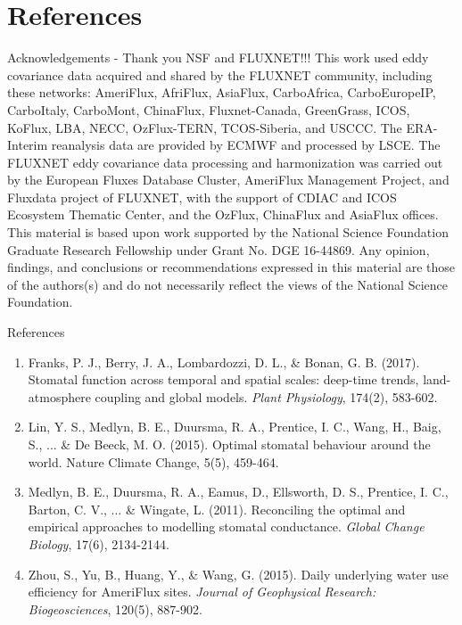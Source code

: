 \documentclass[aspectratio=169]{beamer}
\begin{document}
\section{References}
\begin{frame}{Acknowledgements - Thank you NSF and FLUXNET!!!}
 This work used eddy covariance data acquired and shared by the FLUXNET community, including these networks: AmeriFlux, AfriFlux, AsiaFlux, CarboAfrica, CarboEuropeIP, CarboItaly, CarboMont, ChinaFlux, Fluxnet-Canada, GreenGrass, ICOS, KoFlux, LBA, NECC, OzFlux-TERN, TCOS-Siberia, and USCCC. The ERA-Interim reanalysis data are provided by ECMWF and processed by LSCE. The FLUXNET eddy covariance data processing and harmonization was carried out by the European Fluxes Database Cluster, AmeriFlux Management Project, and Fluxdata project of FLUXNET, with the support of CDIAC and ICOS Ecosystem Thematic Center, and the OzFlux, ChinaFlux and AsiaFlux offices.\\
  \medskip
  This material is based upon work supported by the National Science Foundation Graduate Research Fellowship under Grant No. DGE 16-44869. Any opinion, findings, and conclusions or recommendations expressed in this material are those of the authors(s) and do not necessarily reflect the views of the National Science Foundation.
\end{frame}

\begin{frame}{References}
  \begin{enumerate}
  \item Franks, P. J., Berry, J. A., Lombardozzi, D. L., \& Bonan, G. B. (2017). Stomatal function across temporal and spatial scales: deep-time trends, land-atmosphere coupling and global models. \textit{Plant Physiology}, 174(2), 583-602.
    \item Lin, Y. S., Medlyn, B. E., Duursma, R. A., Prentice, I. C., Wang, H., Baig, S., ... \& De Beeck, M. O. (2015). Optimal stomatal behaviour around the world. Nature Climate Change, 5(5), 459-464.
    \item Medlyn, B. E., Duursma, R. A., Eamus, D., Ellsworth, D. S., Prentice, I. C., Barton, C. V., ... \& Wingate, L. (2011). Reconciling the optimal and empirical approaches to modelling stomatal conductance. \textit{Global Change Biology}, 17(6), 2134-2144.
    \item Zhou, S., Yu, B., Huang, Y., \& Wang, G. (2015). Daily underlying water use efficiency for AmeriFlux sites. \textit{Journal of Geophysical Research: Biogeosciences}, 120(5), 887-902.
    \end{enumerate}
\end{frame}
\end{document}
